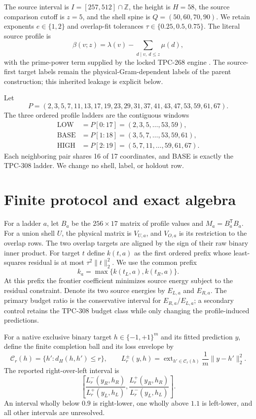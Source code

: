 \documentclass[11pt]{article}
\begin{document}
The source interval is $I=[257,512]\cap\mathbb Z$, the height is $H=58$,
the source comparison cutoff is $z=5$, and the shell spine is
$Q=(50,60,70,90)$.  We retain exponents $e\in\{1,2\}$ and overlap-fit
tolerances $\tau\in\{0.25,0.5,0.75\}$.  The literal source profile is
\[
  \beta(v;z)=\lambda(v)-\sum_{d\mid v,\ d\le z}\mu(d),
\]
with the prime-power term supplied by the locked TPC-268 engine \cite{tpc302}.
The source-first target labels remain the physical-Gram-dependent labels of
the parent construction; this inherited leakage is explicit below.

Let
\[
 P=(2,3,5,7,11,13,17,19,23,29,31,37,41,43,47,53,59,61,67).
\]
The three ordered profile ladders are the contiguous windows
\[
 \begin{split}
 \mathrm{LOW}&=P[0:17]=(2,3,5,\ldots,53,59),\\
 \mathrm{BASE}&=P[1:18]=(3,5,7,\ldots,53,59,61),\\
 \mathrm{HIGH}&=P[2:19]=(5,7,11,\ldots,59,61,67).
 \end{split}                                                    \tag{1}
\]
\noindent Each neighboring pair shares 16 of 17 coordinates, and BASE is
exactly the TPC-308 ladder.  We change no shell, label, or holdout row.

\section{Finite protocol and exact algebra}

For a ladder $a$, let $B_a$ be the $256\times17$ matrix of profile values and
$M_a=B_a^\mathsf{T}B_a$.  For a union shell $U$, the physical matrix is
$V_{U,a}$, and $V_{O,a}$ is its restriction to the overlap rows.  The two
overlap targets are aligned by the sign of their raw binary inner product.
For target $t$ define $k(t,a)$ as the first ordered prefix whose
least-squares residual is at most $\tau^2\|t\|_2^2$.  We use the common prefix
\[
 k_a=\max\{k(t_L,a),k(t_R,a)\}.                         \tag{2}
\]
At this prefix the frontier coefficient minimizes source energy subject to
the residual constraint.  Denote its two source energies by $E_{L,a}$ and
$E_{R,a}$.  The primary budget ratio is the conservative interval for
$E_{R,a}/E_{L,a}$; a secondary control retains the TPC-308 budget class while
only changing the profile-induced predictions.

For a native exclusive binary target $h\in\{-1,+1\}^m$ and its fitted
prediction $y$, define the finite completion ball and its loss envelope by
\[
 \mathcal C_r(h)=\{h':d_H(h,h')\le r\},\qquad
 L_r^\pm(y,h)=\mathop{\mathrm{ext}}_{h'\in\mathcal C_r(h)}
       \frac1m\|y-h'\|_2^2.                                \tag{3}
\]
The reported right-over-left interval is
\[
 \left[\frac{L_r^-(y_R,h_R)}{L_r^+(y_L,h_L)},
        \frac{L_r^+(y_R,h_R)}{L_r^-(y_L,h_L)}\right].        \tag{4}
\]
An interval wholly below $0.9$ is right-lower, one wholly above $1.1$ is
left-lower, and all other intervals are unresolved.
\end{document}
